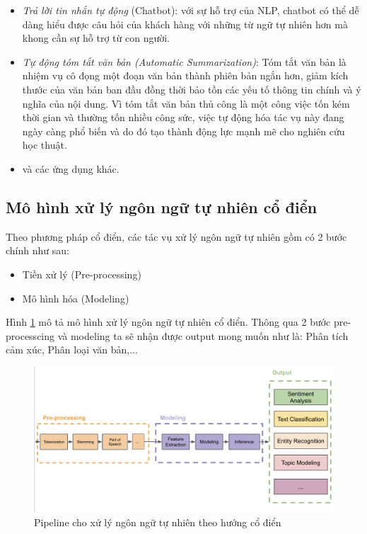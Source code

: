 \begin{itemize}
    \item \emph{Trả lời tin nhắn tự động} (Chatbot): với sự hỗ trợ của NLP, chatbot có thể dễ dàng hiểu được câu hỏi của khách hàng với những từ ngữ tự nhiên hơn mà khong cần sự hỗ trợ từ con người.
    \item \emph{Tự động tóm tắt văn bản (Automatic Summarization)}: Tóm tắt văn bản là nhiệm vụ cô đọng một đoạn văn bản thành phiên bản ngắn hơn, giảm kích thước của văn bản ban đầu đồng thời bảo tồn các yếu tố thông tin chính và ý nghĩa của nội dung. Vì tóm tắt văn bản thủ công là một công việc tốn kém thời gian và thường tốn nhiều công sức, việc tự động hóa tác vụ này đang ngày càng phổ biến và do đó tạo thành động lực mạnh mẽ cho nghiên cứu học thuật.
    \item và các ứng dụng khác.
\end{itemize}

\subsection{Mô hình xử lý ngôn ngữ tự nhiên cổ điển}
\label{sec:classic_nlp}
Theo phương pháp cổ điển, các tác vụ xử lý ngôn ngữ tự nhiên gồm có 2 bước chính như sau:
\begin{itemize}
    \item Tiền xử lý (Pre-processing)
    \item Mô hình hóa (Modeling)
\end{itemize}

Hình \ref{fig:pipeline-nlp-classic} mô tả mô hình xử lý ngôn ngữ tự nhiên cổ điển. Thông qua 2 bước pre-processcing và modeling ta sẽ nhận được output mong muốn như là: Phân tích cảm xúc, Phân loại văn bản,...

\begin{figure}[h!]
\begin{center}
	\includegraphics[width=1.0\textwidth]{chapter04/figure/classic_nlp.png}
	\caption{Pipeline cho xử lý ngôn ngữ tự nhiên theo hướng cổ điển}
	\label{fig:pipeline-nlp-classic}
\end{center}
\end{figure}

